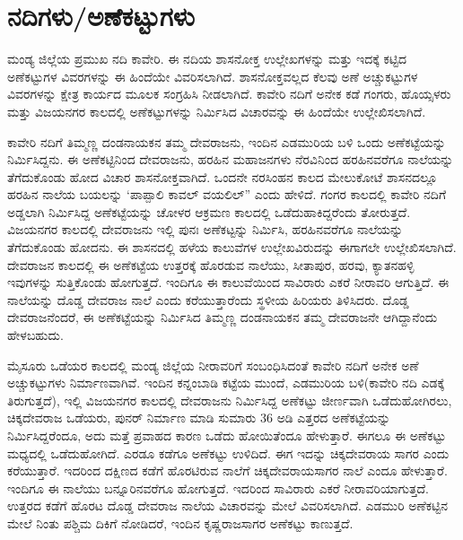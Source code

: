 \vskip 5pt

\section*{ನದಿಗಳು/ಅಣೆಕಟ್ಟುಗಳು}

ಮಂಡ್ಯ ಜಿಲ್ಲೆಯ ಪ್ರಮುಖ ನದಿ ಕಾವೇರಿ. ಈ ನದಿಯ ಶಾಸನೋಕ್ತ ಉಲ್ಲೇಖಗಳನ್ನು ಮತ್ತು ಇದಕ್ಕೆ ಕಟ್ಟಿದ ಅಣೆಕಟ್ಟುಗಳ ವಿವರಗಳನ್ನು ಈ ಹಿಂದೆಯೇ ವಿವರಿಸಲಾಗಿದೆ. ಶಾಸನೋಕ್ತವಲ್ಲದ ಕೆಲವು ಅಣೆ ಅಚ್ಚುಕಟ್ಟುಗಳ ವಿವರಗಳನ್ನು ಕ್ಷೇತ್ರ ಕಾರ್ಯದ ಮೂಲಕ ಸಂಗ್ರಹಿಸಿ ನೀಡಲಾಗಿದೆ. ಕಾವೇರಿ ನದಿಗೆ ಅನೇಕ ಕಡೆ ಗಂಗರು, ಹೊಯ್ಸಳರು ಮತ್ತು ವಿಜಯನಗರ ಕಾಲದಲ್ಲಿ ಅಣೆಕಟ್ಟುಗಳನ್ನು ನಿರ್ಮಿಸಿದ ವಿಚಾರವನ್ನು ಈ ಹಿಂದೆಯೇ ಉಲ್ಲೇಖಿಸಲಾಗಿದೆ.

ಕಾವೇರಿ ನದಿಗೆ ತಿಮ್ಮಣ್ಣ ದಂಡನಾಯಕನ ತಮ್ಮ ದೇವರಾಜನು, ಇಂದಿನ ಎಡಮುರಿಯ ಬಳಿ ಒಂದು ಅಣೆಕಟ್ಟೆಯನ್ನು ನಿರ್ಮಿಸಿದ್ದನು. ಈ ಅಣೆಕಟ್ಟಿನಿಂದ ದೇವರಾಜನು, ಹರಹಿನ ಮಹಾಜನಗಳು ನೆರವಿನಿಂದ ಹರಹಿನವರೆಗೂ ನಾಲೆಯನ್ನು ತೆಗೆದುಕೊಂಡು ಹೋದ ವಿಚಾರ ಶಾಸನೋಕ್ತವಾಗಿದೆ. ಒಂದನೇ ನರಸಿಂಹನ ಕಾಲದ ಮೇಲುಕೋಟೆ ಶಾಸನದಲ್ಲೂ ಹರಹಿನ ನಾಲೆಯ ಬಯಲನ್ನು ‘ಪಾಪ್ಪಾಲಿ ಕಾವಲ್​ ವಯಲಿಲ್​” ಎಂದು ಹೇಳಿದೆ. ಗಂಗರ ಕಾಲದಲ್ಲಿ ಕಾವೇರಿ ನದಿಗೆ ಅಡ್ಡಲಾಗಿ ನಿರ್ಮಿಸಿದ್ದ ಅಣೆಕಟ್ಟೆಯನ್ನು ಚೋಳರ ಆಕ್ರಮಣ ಕಾಲದಲ್ಲಿ ಒಡೆದುಹಾಕಿದ್ದರೆಂದು ತೋರುತ್ತದೆ. ವಿಜಯನಗರ ಕಾಲದಲ್ಲಿ ದೇವರಾಜನು ಇಲ್ಲಿ ಪುನಃ ಅಣೆಕಟ್ಟನ್ನು ನಿರ್ಮಿಸಿ, ಹರಹಿನವರೆಗೂ ನಾಲೆಯನ್ನು ತೆಗೆದುಕೊಂಡು ಹೋದನು. ಈ ಶಾಸನದಲ್ಲಿ ಹಳೆಯ ಕಾಲುವೆಗಳ ಉಲ್ಲೇಖವಿರುದನ್ನು ಈಗಾಗಲೇ ಉಲ್ಲೇಖಿಸಲಾಗಿದೆ. ದೇವರಾಜನ ಕಾಲದಲ್ಲಿ ಈ ಅಣೆಕಟ್ಟೆಯ ಉತ್ತರಕ್ಕೆ ಹೊರಡುವ ನಾಲೆಯು, ಸೀತಾಪುರ, ಹರವು, ಕ್ಯಾತನಹಳ್ಳಿ ಇವುಗಳನ್ನು ಸುತ್ತಿಕೊಂಡು ಹೋಗುತ್ತದೆ. ಇಂದಿಗೂ ಈ ಕಾಲುವೆಯಿಂದ ಸಾವಿರಾರು ಎಕರೆ ನೀರಾವರಿ ಆಗುತ್ತಿದೆ. ಈ ನಾಲೆಯನ್ನು ದೊಡ್ಡ ದೇವರಾಜ ನಾಲೆ ಎಂದು ಕರೆಯುತ್ತಾರೆಂದು ಸ್ಥಳೀಯ ಹಿರಿಯರು ತಿಳಿಸಿದರು. ದೊಡ್ಡ ದೇವರಾಜನೆಂದರೆ, ಈ ಅಣೆಕಟ್ಟೆಯನ್ನು ನಿರ್ಮಿಸಿದ ತಿಮ್ಮಣ್ಣ ದಂಡನಾಯಕನ ತಮ್ಮ ದೇವರಾಜನೇ ಆಗಿದ್ದಾನೆಂದು ಹೇಳಬಹುದು.

ಮೈಸೂರು ಒಡೆಯರ ಕಾಲದಲ್ಲಿ ಮಂಡ್ಯ ಜಿಲ್ಲೆಯ ನೀರಾವರಿಗೆ ಸಂಬಂಧಿಸಿದಂತೆ ಕಾವೇರಿ ನದಿಗೆ ಅನೇಕ ಅಣೆ ಅಚ್ಚುಕಟ್ಟುಗಳು ನಿರ್ಮಾಣವಾಗಿವೆ. ಇಂದಿನ ಕನ್ನಂಬಾಡಿ ಕಟ್ಟೆಯ ಮುಂದೆ, ಎಡಮುರಿಯ ಬಳಿ(ಕಾವೇರಿ ನದಿ ಎಡಕ್ಕೆ ತಿರುಗುತ್ತದೆ), ಇಲ್ಲಿ ವಿಜಯನಗರ ಕಾಲದಲ್ಲಿ ದೇವರಾಜನು ನಿರ್ಮಿಸಿದ್ದ ಅಣೆಕಟ್ಟು ಜೀರ್ಣವಾಗಿ ಒಡೆದುಹೋಗಿರಲು, ಚಿಕ್ಕದೇವರಾಜ ಒಡೆಯರು, ಪುನರ್​ ನಿರ್ಮಾಣ ಮಾಡಿ ಸುಮಾರು 36 ಅಡಿ ಎತ್ತರದ ಅಣೆಕಟ್ಟೆಯನ್ನು ನಿರ್ಮಿಸಿದ್ದರೆಂದೂ, ಅದು ಮತ್ತೆ ಪ್ರವಾಹದ ಕಾರಣ ಒಡೆದು ಹೋಯಿತೆಂದೂ ಹೇಳುತ್ತಾರೆ. ಈಗಲೂ ಈ ಅಣೆಕಟ್ಟು ಮಧ್ಯದಲ್ಲಿ ಒಡೆದುಹೋಗಿದೆ. ಎರಡೂ ಕಡೆಗೂ ಅಣೆಕಟ್ಟು ಉಳಿದಿದೆ. ಈಗ ಇದನ್ನು ಚಿಕ್ಕದೇವರಾಯ ಸಾಗರ ಎಂದು ಕರೆಯುತ್ತಾರೆ. ಇದರಿಂದ ದಕ್ಷಿಣದ ಕಡೆಗೆ ಹೊರಟಿರುವ ನಾಲೆಗೆ ಚಿಕ್ಕದೇವರಾಯಸಾಗರ ನಾಲೆ ಎಂದೂ ಹೇಳುತ್ತಾರೆ. ಇಂದಿಗೂ ಈ ನಾಲೆಯು ಬನ್ನೂರಿನವರೆಗೂ ಹೋಗುತ್ತದೆ. ಇದರಿಂದ ಸಾವಿರಾರು ಎಕರೆ ನೀರಾವರಿಯಾಗುತ್ತದೆ. ಉತ್ತರದ ಕಡೆಗೆ ಹೊರಟ ದೊಡ್ಡ ದೇವರಾಜ ನಾಲೆಯ ವಿಚಾರವನ್ನು ಮೇಲೆ ವಿವರಿಸಲಾಗಿದೆ. ಎಡಮುರಿ ಅಣೆಕಟ್ಟಿನ ಮೇಲೆ ನಿಂತು ಪಶ್ಚಿಮ ದಿಕಿಗೆ ನೋಡಿದರೆ, ಇಂದಿನ ಕೃಷ್ಣರಾಜಸಾಗರ ಅಣೆಕಟ್ಟು ಕಾಣುತ್ತದೆ.

